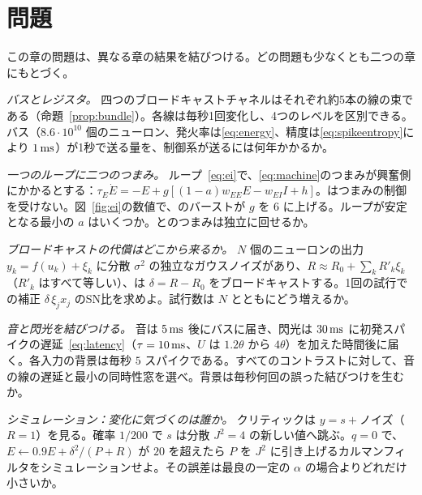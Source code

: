 \section{問題}

この章の問題は、異なる章の結果を結びつける。どの問題も少なくとも二つの章にもとづく。

\begin{exercise}[\lvlA]
\label{ex:10:1}
\emph{バスとレジスタ。} 四つのブロードキャストチャネルはそれぞれ約5本の線の束である（命題~\ref{prop:bundle}）。各線は毎秒1回変化し、4つのレベルを区別できる。バス（$8.6\cdot10^{10}$ 個のニューロン、発火率は\eqref{eq:energy}、精度は\eqref{eq:spikeentropy}により $1\,\text{ms}$）が1秒で送る量を、制御系が送るには何年かかるか。
\end{exercise}

\begin{exercise}[\lvlB]
\label{ex:10:2}
\emph{一つのループに二つのつまみ。} ループ~\eqref{eq:ei}で、\eqref{eq:machine}のつまみが興奮側にかかるとする：$\tau_E\dot E=-E+g[(1-a)w_{EE}E-w_{EI}I+h]$。はつまみの制御を受けない。図~\ref{fig:ei}の数値で、のバーストが $g$ を $6$ に上げる。ループが安定となる最小の $a$ はいくつか。とのつまみは独立に回せるか。
\end{exercise}

\begin{exercise}[\lvlB]
\label{ex:10:3}
\emph{ブロードキャストの代償はどこから来るか。} $N$ 個のニューロンの出力 $y_k=f(u_k)+\xi_k$ に分散 $\sigma^2$ の独立なガウスノイズがあり、$R\approx R_0+\sum_kR'_k\xi_k$（$R'_k$ はすべて等しい）、は $\delta=R-R_0$ をブロードキャストする。1回の試行での補正 $\delta\,\xi_jx_j$ のSN比を求めよ。試行数は $N$ とともにどう増えるか。
\end{exercise}

\begin{exercise}[\lvlB]
\label{ex:10:4}
\emph{音と閃光を結びつける。} 音は $5\,\text{ms}$ 後にバスに届き、閃光は $30\,\text{ms}$ に初発スパイクの遅延~\eqref{eq:latency}（$\tau=10\,\text{ms}$、$U$ は $1.2\theta$ から $4\theta$）を加えた時間後に届く。各入力の背景は毎秒 $5$ スパイクである。すべてのコントラストに対して、音の線の遅延と最小の同時性窓を選べ。背景は毎秒何回の誤った結びつけを生むか。
\end{exercise}

\begin{exercise}[\lvlB]
\label{ex:10:5}
\emph{シミュレーション：変化に気づくのは誰か。} クリティックは $y=s+\text{ノイズ}$（$R=1$）を見る。確率 $1/200$ で $s$ は分散 $J^2=4$ の新しい値へ跳ぶ。$q=0$ で、$E\leftarrow0.9E+\delta^2/(P+R)$ が $20$ を超えたら $P$ を $J^2$ に引き上げるカルマンフィルタをシミュレーションせよ。その誤差は最良の一定の $\alpha$ の場合よりどれだけ小さいか。
\end{exercise}

